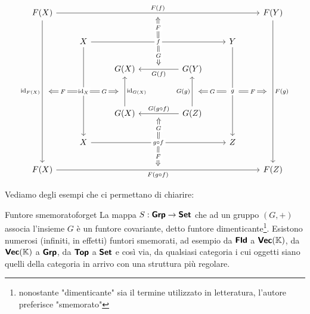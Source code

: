 \documentclass{article}
\begin{document}
\[\begin{tikzcd}
	{F(X)} &&&&&& {F(Y)} \\
	& X &&&& Y \\
	&& {G(X)} && {G(Y)} \\
	\\
	&& {G(X)} && {G(Z)} \\
	& X &&&& Z \\
	{F(X)} &&&&&& {F(Z)}
	\arrow[""{name=0, anchor=center, inner sep=0}, "{F(f)}", from=1-1, to=1-7]
	\arrow[""{name=1, anchor=center, inner sep=0}, "{\id{F(X)}}"', from=1-1, to=7-1]
	\arrow[""{name=2, anchor=center, inner sep=0}, "{F(g)}", from=1-7, to=7-7]
	\arrow[""{name=3, anchor=center, inner sep=0}, "f"{description}, from=2-2, to=2-6]
	\arrow[""{name=4, anchor=center, inner sep=0}, "{\id{X}}"{description}, from=2-2, to=6-2]
	\arrow[""{name=5, anchor=center, inner sep=0}, "g"{description}, from=2-6, to=6-6]
	\arrow[""{name=6, anchor=center, inner sep=0}, "{G(f)}", from=3-5, to=3-3]
	\arrow[""{name=7, anchor=center, inner sep=0}, "{\id{G(X)}}"', from=5-3, to=3-3]
	\arrow[""{name=8, anchor=center, inner sep=0}, "{G(g)}", from=5-5, to=3-5]
	\arrow[""{name=9, anchor=center, inner sep=0}, "{G(g \circ f)}"', from=5-5, to=5-3]
	\arrow[""{name=10, anchor=center, inner sep=0}, "{g \circ f}"{description}, from=6-2, to=6-6]
	\arrow[""{name=11, anchor=center, inner sep=0}, "{F(g \circ f)}"', from=7-1, to=7-7]
	\arrow["F"{description}, shorten <=4pt, shorten >=4pt, Rightarrow, from=3, to=0]
	\arrow["G"{description}, shorten <=7pt, shorten >=7pt, Rightarrow, from=4, to=7]
	\arrow["G"{description}, shorten <=4pt, shorten >=4pt, Rightarrow, from=3, to=6]
	\arrow["F"{description}, shorten <=7pt, shorten >=7pt, Rightarrow, from=4, to=1]
	\arrow["G"{description}, shorten <=7pt, shorten >=7pt, Rightarrow, from=5, to=8]
	\arrow["F"{description}, shorten <=7pt, shorten >=7pt, Rightarrow, from=5, to=2]
	\arrow["G"{description}, shorten <=4pt, shorten >=4pt, Rightarrow, from=10, to=9]
	\arrow["F"{description}, shorten <=4pt, shorten >=4pt, Rightarrow, from=10, to=11]
\end{tikzcd}\]

Vediamo degli esempi che ci permettano di chiarire:

\begin{example}{Funtore smemorato}{forget}
    La mappa $S:\text{\sffamily\textbf{Grp}} \to \text{\sffamily\textbf{Set}}$ che ad un gruppo $(G,+)$ associa l'insieme $G$ è un funtore covariante, detto funtore dimenticante\footnote{nonostante "dimenticante" sia il termine utilizzato in letteratura, l'autore preferisce "smemorato"}. Esistono numerosi (infiniti, in effetti) funtori smemorati, ad esempio da $\text{\sffamily\textbf{Fld}}$ a $\text{\sffamily\textbf{Vec}}(\mathbb{K})$, da $\text{\sffamily\textbf{Vec}}(\mathbb{K})$ a $\text{\sffamily\textbf{Grp}}$, da $\text{\sffamily\textbf{Top}}$ a $\text{\sffamily\textbf{Set}}$ e così via, da qualsiasi categoria i cui oggetti siano quelli della categoria in arrivo con una struttura più regolare.
\end{example}
\end{document}
